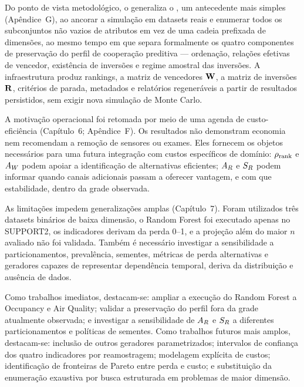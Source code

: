 Do ponto de vista metodológico, o \CoInfoSim{} generaliza o \SLACGS{}, um antecedente mais simples (Apêndice~G), ao ancorar a simulação em datasets reais e enumerar todos os subconjuntos não vazios de atributos em vez de uma cadeia prefixada de dimensões, ao mesmo tempo em que separa formalmente os quatro componentes de preservação do perfil de cooperação preditiva --- ordenação, relações efetivas de vencedor, existência de inversões e regime amostral das inversões. A infraestrutura produz rankings, a matriz de vencedores $\mathbf{W}$, a matriz de inversões $\mathbf{R}$, critérios de parada, metadados e relatórios regeneráveis a partir de resultados persistidos, sem exigir nova simulação de Monte Carlo.

A motivação operacional foi retomada por meio de uma agenda de custo-eficiência (Capítulo~6; Apêndice~F). Os resultados não demonstram economia nem recomendam a remoção de sensores ou exames. Eles fornecem os objetos necessários para uma futura integração com custos específicos de domínio: $\rho_{\mathrm{rank}}$ e $A_W$ podem apoiar a identificação de alternativas eficientes; $A_R$ e $S_R$ podem informar quando canais adicionais passam a oferecer vantagem, e com que estabilidade, dentro da grade observada.

As limitações impedem generalizações amplas (Capítulo~7). Foram utilizados três datasets binários de baixa dimensão, o Random Forest foi executado apenas no SUPPORT2, os indicadores derivam da perda 0--1, e a projeção além do maior $n$ avaliado não foi validada. Também é necessário investigar a sensibilidade a particionamentos, prevalência, sementes, métricas de perda alternativas e geradores capazes de representar dependência temporal, deriva da distribuição e ausência de dados.

Como trabalhos imediatos, destacam-se: ampliar a execução do Random Forest a Occupancy e Air Quality; validar a preservação do perfil fora da grade atualmente observada; e investigar a sensibilidade de $A_R$ e $S_R$ a diferentes particionamentos e políticas de sementes. Como trabalhos futuros mais amplos, destacam-se: inclusão de outros geradores parametrizados; intervalos de confiança dos quatro indicadores por reamostragem; modelagem explícita de custos; identificação de fronteiras de Pareto entre perda e custo; e substituição da enumeração exaustiva por busca estruturada em problemas de maior dimensão.

